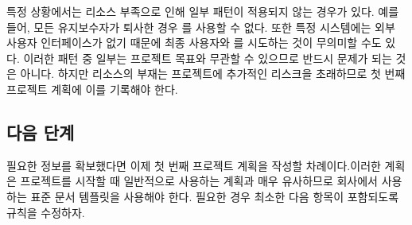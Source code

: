 \documentclass[a4paper,10pt,twoside]{book}
\begin{document}
특정 상황에서는 리소스 부족으로 인해 일부 패턴이 적용되지 않는 경우가 있다. 예를 들어, 모든 유지보수자가 퇴사한 경우 를 사용할 수 없다. 또한 특정 시스템에는 외부 사용자 인터페이스가 없기 때문에 최종 사용자와 를 시도하는 것이 무의미할 수도 있다. 이러한 패턴 중 일부는 프로젝트 목표와 무관할 수 있으므로 반드시 문제가 되는 것은 아니다. 하지만 리소스의 부재는 프로젝트에 추가적인 리스크을 초래하므로 첫 번째 프로젝트 계획에 이를 기록해야 한다.

\subsection*{다음 단계}

필요한 정보를 확보했다면 이제 첫 번째 프로젝트 계획을 작성할 차례이다.이러한 계획은 프로젝트를 시작할 때 일반적으로 사용하는 계획과 매우 유사하므로 회사에서 사용하는 표준 문서 템플릿을 사용해야 한다. 필요한 경우 최소한 다음 항목이 포함되도록 규칙을 수정하자.
\end{document}
